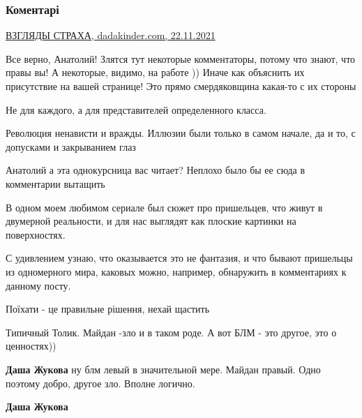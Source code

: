  
 
 
 
 
\subsubsection{Коментарі}

\begin{itemize} %
\href{https://dadakinder.com/txt/2021/11/maidan-2021}{%
ВЗГЛЯДЫ СТРАХА, dadakinder.com, 22.11.2021%
}


Все верно, Анатолий! Злятся тут некоторые комментаторы, потому что знают, что
правы вы! А некоторые, видимо, на работе )) Иначе как объяснить их присутствие
на вашей странице! Это прямо смердяковщина какая-то с их стороны

Не для каждого, а для представителей определенного класса.

Революция ненависти и вражды. Иллюзии были только в самом начале, да и то, с допусками и закрыванием глаз

Анатолий а эта однокурсница вас читает? Неплохо было бы ее сюда в комментарии вытащить


В одном моем любимом сериале был сюжет про пришельцев, что живут в двумерной
реальности, и для нас выглядят как плоские картинки на поверхностях.

С удивлением узнаю, что оказывается это не фантазия, и что бывают пришельцы из
одномерного мира, каковых можно, например, обнаружить в комментариях к данному
посту.


Поїхати - це правильне рішення, нехай щастить

Типичный Толик. Майдан -зло и в таком роде. А вот БЛМ - это другое, это о ценностях))

\begin{itemize} %
\textbf{Даша Жукова} ну блм левый в значительной мере. Майдан правый. Одно поэтому добро, другое зло. Вполне логично.

\textbf{Даша Жукова} 


\end{itemize}
\end{itemize}
